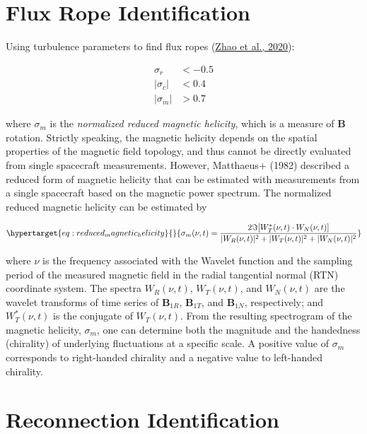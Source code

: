\documentclass[
  notoc %
]{tufte-book}
\begin{document}
\hypertarget{flux-rope-identification}{%
\section{Flux Rope Identification}\label{flux-rope-identification}}

Using turbulence parameters to find flux ropes
(\protect\hyperlink{ref-zhao2020identification}{Zhao et al., 2020}):

\[
\begin{aligned}
\sigma_r &< -0.5 \\
|\sigma_c| &< 0.4 \\
|\sigma_m| &> 0.7
\end{aligned}
\]

where \(\sigma_m\) is the \emph{normalized reduced magnetic helicity},
which is a measure of \(\mathbf{B}\) rotation. Strictly speaking, the
magnetic helicity depends on the spatial properties of the magnetic
field topology, and thus cannot be directly evaluated from single
spacecraft measurements. However, Matthaeus+ (1982) described a reduced
form of magnetic helicity that can be estimated with measurements from a
single spacecraft based on the magnetic power spectrum. The normalized
reduced magnetic helicity can be estimated by

\begin{equation}\protect\hypertarget{eq:reduced_magnetic_helicity}{}{
\sigma_m(\nu, t) = \frac{2\Im[W_T^\ast(\nu, t)\cdot W_N(\nu, t)]}{|W_R(\nu, t)|^2 + |W_T(\nu, t)|^2 + |W_N(\nu, t)|^2}
}\label{eq:reduced_magnetic_helicity}\end{equation}

where \(\nu\) is the frequency associated with the Wavelet function and
the sampling period of the measured magnetic field in the radial
tangential normal (RTN) coordinate system. The spectra \(W_R(\nu, t)\),
\(W_T(\nu, t)\), and \(W_N(\nu, t)\) are the wavelet transforms of time
series of \(\mathbf{B}_{1R}\), \(\mathbf{B}_{1T}\), and
\(\mathbf{B}_{1N}\), respectively; and \(W_T^\ast(\nu,t)\) is the
conjugate of \(W_T(\nu,t)\). From the resulting spectrogram of the
magnetic helicity, \(\sigma_m\), one can determine both the magnitude
and the handedness (chirality) of underlying fluctuations at a specific
scale. A positive value of \(\sigma_m\) corresponds to right-handed
chirality and a negative value to left-handed chirality.

\hypertarget{reconnection-identification}{%
\section{Reconnection
Identification}\label{reconnection-identification}}
\end{document}
